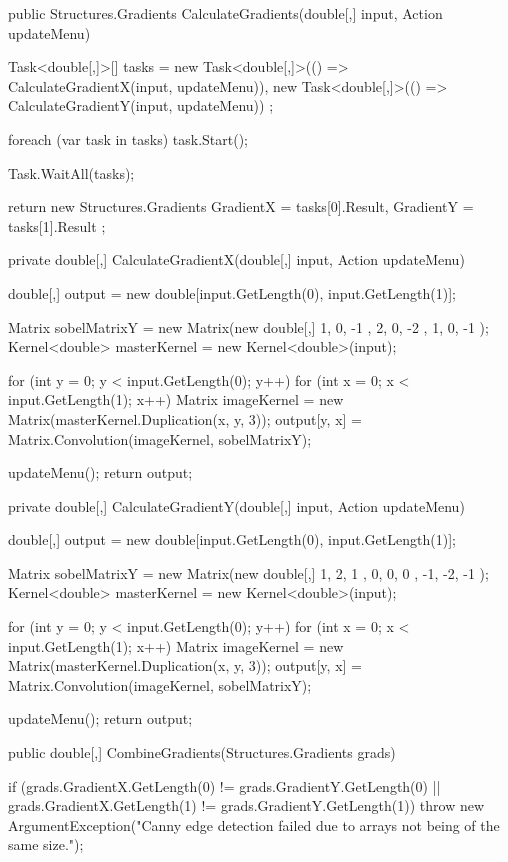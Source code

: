 \begin{flushleft}
\begin{cscode}
{    public Structures.Gradients CalculateGradients(double[,] input, Action updateMenu)
    {
        Task<double[,]>[] tasks =
        {
            new Task<double[,]>(() => CalculateGradientX(input, updateMenu)),
            new Task<double[,]>(() => CalculateGradientY(input, updateMenu))
        };

        foreach (var task in tasks) task.Start();

        Task.WaitAll(tasks);

        return new Structures.Gradients
        {
            GradientX = tasks[0].Result,
            GradientY = tasks[1].Result
        };
    }

    private double[,] CalculateGradientX(double[,] input, Action updateMenu)
    {
        double[,] output = new double[input.GetLength(0), input.GetLength(1)];

        Matrix sobelMatrixY = new Matrix(new double[,] { { 1, 0, -1 }, { 2, 0, -2 }, { 1, 0, -1 } });
        Kernel<double> masterKernel = new Kernel<double>(input);

        for (int y = 0; y < input.GetLength(0); y++)
        {
            for (int x = 0; x < input.GetLength(1); x++)
            {
                Matrix imageKernel = new Matrix(masterKernel.Duplication(x, y, 3));
                output[y, x] = Matrix.Convolution(imageKernel, sobelMatrixY);
            }
        }

        updateMenu();
        return output;
    }

    private double[,] CalculateGradientY(double[,] input, Action updateMenu)
    {
        double[,] output = new double[input.GetLength(0), input.GetLength(1)];

        Matrix sobelMatrixY = new Matrix(new double[,] { { 1, 2, 1 }, { 0, 0, 0 }, { -1, -2, -1 } });
        Kernel<double> masterKernel = new Kernel<double>(input);

        for (int y = 0; y < input.GetLength(0); y++)
        {
            for (int x = 0; x < input.GetLength(1); x++)
            {
                Matrix imageKernel = new Matrix(masterKernel.Duplication(x, y, 3));
                output[y, x] = Matrix.Convolution(imageKernel, sobelMatrixY);
            }
        }

        updateMenu();
        return output;
    }

    public double[,] CombineGradients(Structures.Gradients grads)
    {
        if (grads.GradientX.GetLength(0) != grads.GradientY.GetLength(0) || grads.GradientX.GetLength(1) != grads.GradientY.GetLength(1))
            throw new ArgumentException("Canny edge detection failed due to arrays not being of the same size.");

}}
\end{cscode}
\end{flushleft}
